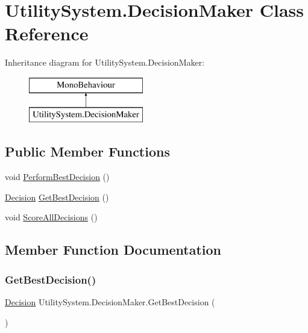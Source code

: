 \hypertarget{class_utility_system_1_1_decision_maker}{}\section{Utility\+System.\+Decision\+Maker Class Reference}
\label{class_utility_system_1_1_decision_maker}
Inheritance diagram for Utility\+System.\+Decision\+Maker\+:\begin{figure}[H]
\begin{center}
\leavevmode
\includegraphics[height=2.000000cm]{class_utility_system_1_1_decision_maker}
\end{center}
\end{figure}
\subsection*{Public Member Functions}
\begin{DoxyCompactItemize}
\item 
void \mbox{\hyperlink{class_utility_system_1_1_decision_maker_a51ccf99d911381b29ca61d69697e93dc}{Perform\+Best\+Decision}} ()
\item 
\mbox{\hyperlink{class_utility_system_1_1_decision}{Decision}} \mbox{\hyperlink{class_utility_system_1_1_decision_maker_a696dfddb4eb31cb1498df83fa6304ae5}{Get\+Best\+Decision}} ()
\item 
void \mbox{\hyperlink{class_utility_system_1_1_decision_maker_ac342e07ac99e8de808e7bbc9faa59a1a}{Score\+All\+Decisions}} ()
\end{DoxyCompactItemize}


\subsection{Member Function Documentation}
\mbox{\label{class_utility_system_1_1_decision_maker_a696dfddb4eb31cb1498df83fa6304ae5}} 
\subsubsection{\texorpdfstring{Get\+Best\+Decision()}{GetBestDecision()}}
{\footnotesize\ttfamily \mbox{\hyperlink{class_utility_system_1_1_decision}{Decision}} Utility\+System.\+Decision\+Maker.\+Get\+Best\+Decision (\begin{DoxyParamCaption}{ }\end{DoxyParamCaption})}

